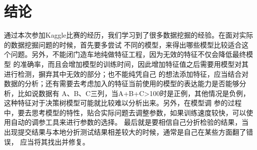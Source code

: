 \section{结论}
\label{sec:conclusion}
通过本次参加Kaggle比赛的经历，我们学习到了很多数据挖掘的经验。在面对实际的数据挖掘问题的时候，首先要多尝试
不同的模型，来得出哪些模型比较适合这个问题。另外，不能闭门造车地纯做特征工程，因为无效的特征不仅会降低最终模型
的准确率，而且会增加模型的训练时间，因此增加特征值之后需要用模型对其进行检测，摒弃其中无效的部分；也不能纯凭自己
的想法添加特征，应当结合对数据的分析；还有需要去考虑加入的特征当前使用的模型的表达能力是否能够分析，比如说数据有
A、B、C三列，当A+B+C>100时是正例，其他情况是负例，这种特征对于决策树模型可能就比较难以分析出来。另外，在模型调
参的过程中，要去思考模型的特性，贴合实际问题去调整参数，如果训练速度较快，可以使用自动的调参工具来进行参数的选择。
最后就是要相信自己分折检验的结果，当出现提交结果与本地分折测试结果相差较大的时候，通常是自己在某些方面翻了错误，
应当将其找出并修复。